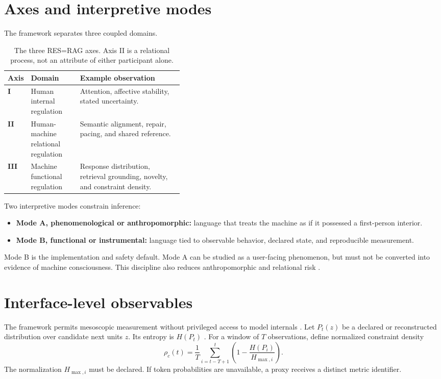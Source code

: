 \documentclass[11pt]{article}
\begin{document}
\section{Axes and interpretive modes}

The framework separates three coupled domains.

\begin{table}[ht]
\centering
\small
\begin{tabularx}{\linewidth}{>{\bfseries}p{0.12\linewidth}p{0.28\linewidth}X}
\toprule
Axis & Domain & Example observation\\
\midrule
I & Human internal regulation
  & Attention, affective stability, stated uncertainty.\\
II & Human-machine relational regulation
   & Semantic alignment, repair, pacing, and shared reference.\\
III & Machine functional regulation
    & Response distribution, retrieval grounding, novelty, and constraint
      density.\\
\bottomrule
\end{tabularx}
\caption{The three RES=RAG axes. Axis II is a relational process, not an
attribute of either participant alone.}
\label{tab:axes}
\end{table}

Two interpretive modes constrain inference:
\begin{itemize}
  \item \textbf{Mode A, phenomenological or anthropomorphic:} language that
        treats the machine as if it possessed a first-person interior.
  \item \textbf{Mode B, functional or instrumental:} language tied to
        observable behavior, declared state, and reproducible measurement.
\end{itemize}
Mode B is the implementation and safety default. Mode A can be studied as a
user-facing phenomenon, but must not be converted into evidence of machine
consciousness. This discipline also reduces anthropomorphic and relational
risk \citep{bender2021,weidinger2022}.

\section{Interface-level observables}

The framework permits mesoscopic measurement without privileged access to
model internals \citep{slade-tassan-uftid}. Let $P_t(z)$ be a declared or
reconstructed distribution over candidate next units $z$. Its entropy is
$H(P_t)$ \citep{shannon1948,cover2006}. For a window of $T$ observations,
define normalized constraint density
\begin{equation}
\rho_c(t)
=
\frac{1}{T}\sum_{i=t-T+1}^{t}
\left(1-\frac{H(P_i)}{H_{\max,i}}\right).
\label{eq:density}
\end{equation}
The normalization $H_{\max,i}$ must be declared. If token probabilities are
unavailable, a proxy receives a distinct metric identifier.
\end{document}
